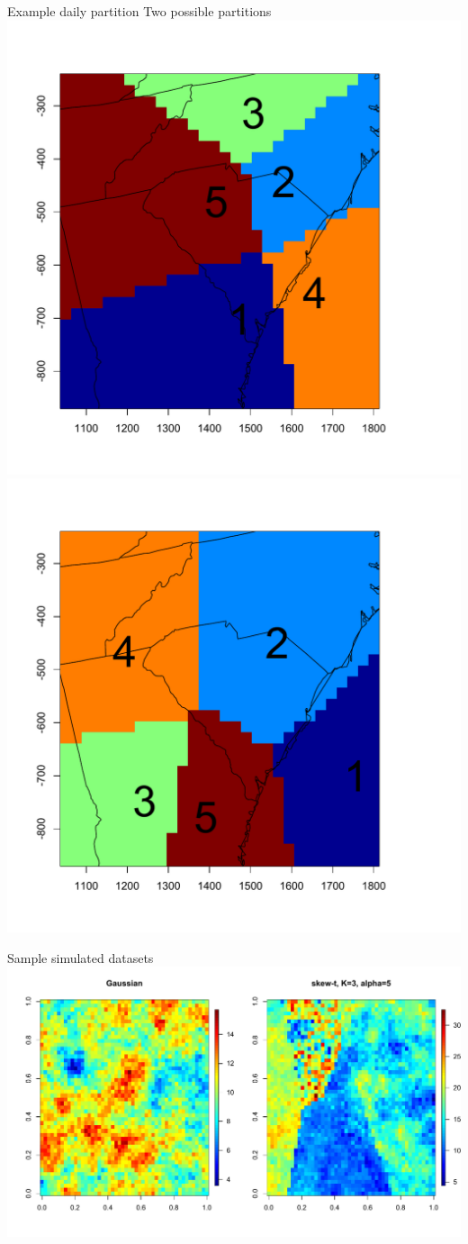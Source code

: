 \documentclass{beamer}
\begin{document}
\begin{frame}{Example daily partition}
	Two possible partitions
    \centering
    \includegraphics[width=0.54\linewidth]{./plots/example-partition-1.pdf}
    \includegraphics[width=0.54\linewidth]{./plots/example-partition-2.pdf}
\end{frame}

\begin{frame}{Sample simulated datasets}
  \centering
  \includegraphics[width=1\linewidth]{./plots/gauss-vs-skew-t3.pdf}
\end{frame}
\end{document}
